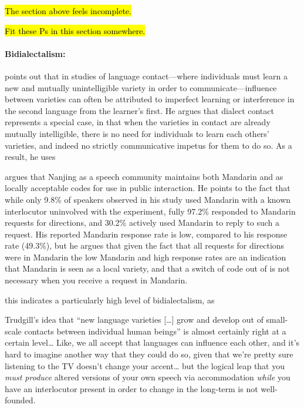     \hl{The section above feels incomplete.}

    \hl{Fit these Ps in this section somewhere.}   \paragraph{Bidialectalism:}
    \cite{trudgill1986dialects} points out that in studies of language contact---where individuals must learn a new and mutually unintelligible variety in order to communicate---influence between varieties can often be attributed to imperfect learning or interference in the second language from the learner's first. He argues that dialect contact represents a special case, in that when the varieties in contact are already mutually intelligible, there is no need for individuals to learn each others' varieties, and indeed no strictly communicative impetus for them to do so. As a result, he uses
    
    \cite{xu2006nanjing} argues that Nanjing as a speech community maintains both Mandarin and \ND{} as locally acceptable codes for use in public interaction. He points to the fact that while only 9.8\% of speakers observed in his study used Mandarin with a known interlocutor uninvolved with the experiment, fully 97.2\% responded to Mandarin requests for directions, and 30.2\% actively used Mandarin to reply to such a request. His reported Mandarin response rate is low, compared to his \ND{} response rate (49.3\%), but he argues that given the fact that all requests for directions were in Mandarin the low Mandarin and high \ND{} response rates are an indication that Mandarin is seen as a local variety, and that a switch of code out of \ND{} is not necessary when you receive a request in Mandarin.
    
    this indicates a particularly high level of bidialectalism, as
    
    Trudgill's idea that ``new language varieties [\ldots{}] grow and develop out of small-scale contacts between individual human beings'' \citeyearpar[p.161]{trudgill1986dialects} is almost certainly right at a certain level\ldots{} Like, we all accept that languages can influence each other, and it's hard to imagine another way that they could do so, given that we're pretty sure listening to the TV doesn't change your accent\ldots{} but the logical leap that you \emph{must produce} altered versions of your own speech via accommodation \emph{while} you have an interlocutor present in order to change in the long-term is not well-founded.
    
